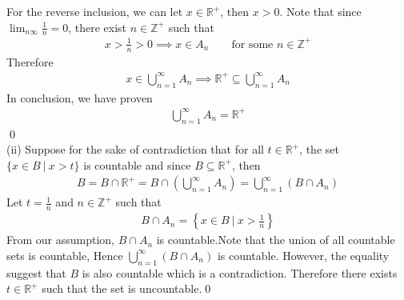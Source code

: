 \documentclass[12pt]{article}
\newcommand{\R}{\mathbb{R}}
\newcommand{\Z}{\mathbb{Z}}
\begin{document}
For the reverse inclusion, we can let $x\in\R^+$, then $x>0$. Note that since $\displaystyle{\lim_{n\infty}\frac{1}{n}=0}$, there exist $n\in\Z^+$ such that
\begin{align*}
    x>\frac{1}{n}>0\implies x\in A_n\qquad\text{for some }n\in\Z^+
\end{align*}
Therefore
\begin{align*}
    x\in \bigcup_{n=1}^\infty A_n\implies \R^+\subseteq\bigcup_{n=1}^\infty A_n
\end{align*}
In conclusion, we have proven
\begin{align*}
    \bigcup_{n=1}^\infty A_n=\R^+
\end{align*}\qed\\[2em]
(ii) Suppose for the sake of contradiction that for all $t\in\R^+$, the set $\{x\in B\ |\ x>t\}$ is countable and since $B\subseteq \R^+$, then
\begin{align*}
    B=B\cap \R^+=B\cap\left(\bigcup_{n=1}^\infty A_n\right)=\bigcup_{n=1}^\infty (B\cap A_n)
\end{align*}
Let $t=\frac{1}{n}$ and $n\in\Z^+$ such that
\begin{align*}
    B\cap A_n=\left\{x\in B\ |\ x>\frac{1}{n}\right\}
\end{align*}
From our assumption, $B\cap A_n$ is countable.Note that the union of all countable sets is countable, Hence $\bigcup_{n=1}^\infty (B\cap A_n)$ is countable. However, the equality suggest that $B$ is also countable which is a contradiction. Therefore there exists $t\in\R^+$ such that the set is uncountable.\qed
\end{document}

